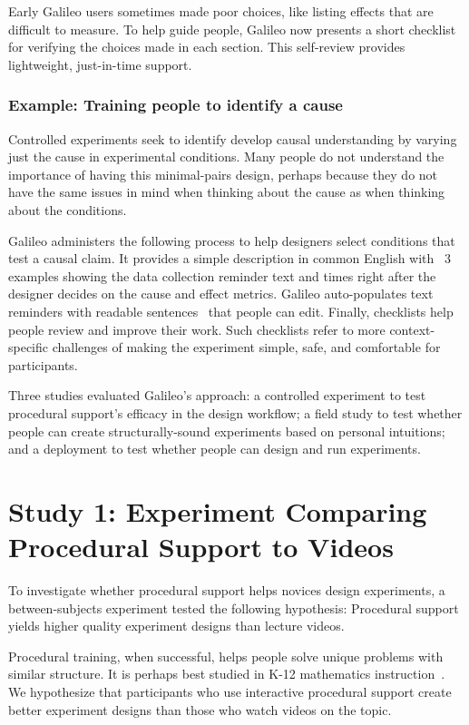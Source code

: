 Early Galileo users sometimes made poor choices, like listing effects that are difficult to measure. To help guide people, Galileo now presents a short checklist for verifying the choices made in each section. This self-review provides lightweight, just-in-time support.

\subsubsection{Example: Training people to identify a cause}
Controlled experiments seek to identify develop causal understanding by varying just the cause in experimental conditions. Many people do not understand the importance of having this minimal-pairs design, perhaps because they do not have the same issues in mind when thinking about the cause as when thinking about the conditions.

Galileo administers the following process to help designers select conditions that test a causal claim. It provides a simple description in common English with ~3 examples showing the data collection reminder text and times right after the designer decides on the cause and effect metrics. Galileo auto-populates text reminders with readable sentences~\cite{Levy2013} that people can edit. Finally, checklists help people review and improve their work. Such checklists refer to more context-specific challenges of making the experiment simple, safe, and comfortable for participants.
 
Three studies evaluated Galileo's approach: a controlled experiment to test procedural support's efficacy in the design workflow; a field study to test whether people can create structurally-sound experiments based on personal intuitions; and a deployment to test whether people can design and run experiments. 

\section{Study 1: Experiment Comparing Procedural Support to Videos}
To investigate whether procedural support helps novices design experiments, a between-subjects experiment tested the following hypothesis: Procedural support yields higher quality experiment designs than lecture videos. 

Procedural training, when successful, helps people solve unique problems with similar structure. It is perhaps best studied in K-12 mathematics instruction~\cite{Rittle-Johnson1999}. We hypothesize that participants who use interactive procedural support create better experiment designs than those who watch videos on the topic. 

